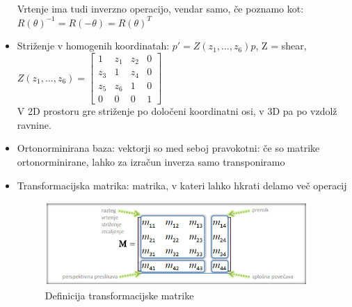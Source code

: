\documentclass{article}
\begin{document}
\begin{itemize}
Vrtenje ima tudi inverzno operacijo, vendar samo, če poznamo kot: $R(\theta)^{-1} = R(-\theta) = R(\theta)^T$
    \item Striženje v homogenih koordinatah: $p' = Z(z_1,\dots,z_6)p$, Z = shear, $Z(z_1,\dots,z_6) = \begin{bmatrix} 1 & z_1 & z_2 & 0 \\ z_3 & 1 & z_4 & 0 \\ z_5 & z_6 & 1 & 0 \\ 0 & 0 & 0 & 1 \end{bmatrix}$ \\ V 2D prostoru gre striženje po določeni koordinatni osi, v 3D pa po vzdolž ravnine.
    \item Ortonorminirana baza: vektorji so med seboj pravokotni: če so matrike ortonorminirane, lahko za izračun inverza samo transponiramo
    \item Transformacijska matrika: matrika, v kateri lahko hkrati delamo več operacij
    \begin{figure}[H]
    \centering
    \includegraphics[width=100mm]{src/transformacijska_matrika.png}
    \caption{Definicija transformacijske matrike}
    \end{figure}   
\end{itemize}
\end{document}
